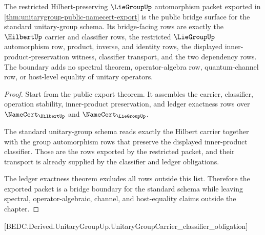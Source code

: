 \begin{theorem}
\label{thm:unitarygroup-public-standard-bridge-boundary}
The restricted Hilbert-preserving $\LieGroupUp$ automorphism packet exported in
\autoref{thm:unitarygroup-public-namecert-export} is the public bridge surface
for the standard unitary-group schema. Its bridge-facing rows are exactly the
$\HilbertUp$ carrier and classifier rows, the restricted $\LieGroupUp$
automorphism row, product, inverse, and identity rows, the displayed
inner-product-preservation witness, classifier transport, and the two
dependency rows. The boundary adds no spectral theorem, operator-algebra row,
quantum-channel row, or host-level equality of unitary operators.
\end{theorem}
\begin{proof}
Start from the public export theorem. It assembles the carrier, classifier,
operation stability, inner-product preservation, and ledger exactness rows over
$\NameCert_{\HilbertUp}$ and $\NameCert_{\LieGroupUp}$.

The standard unitary-group schema reads exactly the Hilbert carrier together
with the group automorphism rows that preserve the displayed inner-product
classifier. Those are the rows exported by the restricted packet, and their
transport is already supplied by the classifier and ledger obligations.

The ledger exactness theorem excludes all rows outside this list. Therefore
the exported packet is a bridge boundary for the standard schema while leaving
spectral, operator-algebraic, channel, and host-equality claims outside the
chapter.
\end{proof}

[BEDC.Derived.UnitaryGroupUp.UnitaryGroupCarrier\_classifier\_obligation]

